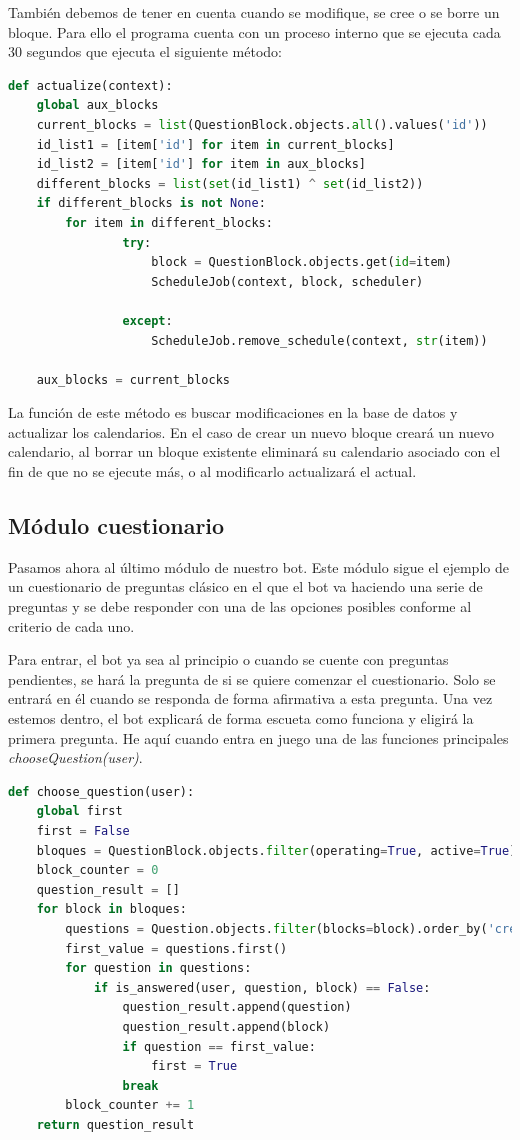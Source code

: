 También debemos de tener en cuenta cuando se modifique, se cree o se borre un bloque. Para ello el programa cuenta con un proceso interno que se ejecuta cada 30 segundos que ejecuta el siguiente método:

\begin{lstlisting}[language=Python]
    def actualize(context):
    global aux_blocks
    current_blocks = list(QuestionBlock.objects.all().values('id'))
    id_list1 = [item['id'] for item in current_blocks]
    id_list2 = [item['id'] for item in aux_blocks]
    different_blocks = list(set(id_list1) ^ set(id_list2))
    if different_blocks is not None:
        for item in different_blocks:
                try:
                    block = QuestionBlock.objects.get(id=item)
                    ScheduleJob(context, block, scheduler)

                except:
                    ScheduleJob.remove_schedule(context, str(item))

    aux_blocks = current_blocks
\end{lstlisting}

La función de este método es buscar modificaciones en la base de datos y actualizar los calendarios. En el caso de crear un nuevo bloque creará un nuevo calendario, al borrar un bloque existente eliminará su calendario asociado con el fin de que no se ejecute más, o al modificarlo actualizará el actual.


\subsection{Módulo cuestionario}


Pasamos ahora al último módulo de nuestro bot. Este módulo sigue el ejemplo de un cuestionario de preguntas clásico en el que el bot va haciendo una serie de preguntas y se debe responder con una de las opciones posibles conforme al criterio de cada uno. 

Para entrar, el bot ya sea al principio o cuando se cuente con preguntas pendientes, se hará la pregunta de si se quiere comenzar el cuestionario. Solo se entrará en él cuando se responda de forma afirmativa a esta pregunta. Una vez estemos dentro, el bot explicará de forma escueta como funciona y eligirá la primera pregunta. He aquí cuando entra en juego una de las funciones principales \textit{chooseQuestion(user)}.

\begin{lstlisting}[language=Python]
def choose_question(user):
    global first
    first = False
    bloques = QuestionBlock.objects.filter(operating=True, active=True).order_by('-importance')
    block_counter = 0
    question_result = []
    for block in bloques:
        questions = Question.objects.filter(blocks=block).order_by('create')
        first_value = questions.first()
        for question in questions:
            if is_answered(user, question, block) == False:
                question_result.append(question)
                question_result.append(block)
                if question == first_value:
                    first = True
                break
        block_counter += 1
    return question_result
\end{lstlisting}

